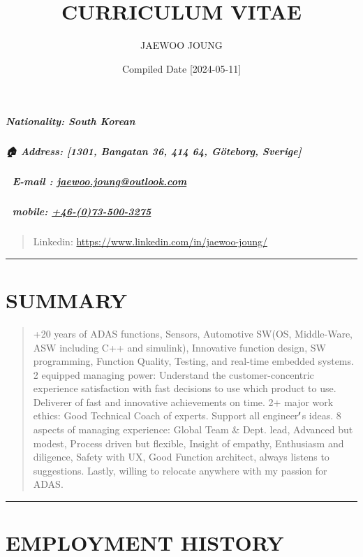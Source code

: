 \documentclass[12pt,a4paper]{article}
\title{ CURRICULUM VITAE }
\author{ JAEWOO JOUNG }
\date{ Compiled Date [2024-05-11] }
\begin{document}
\maketitle

\subparagraph{Nationality: South Korean}
\subparagraph{🏠 Address: [1301, Bangatan 36, 414 64, Göteborg, Sverige]}
\subparagraph{📨 E-mail : \href{mailto:jaewoo.joung@outlook.com}{jaewoo.joung@outlook.com}}
\subparagraph{📲 mobile:  \href{+46-(0)73-500-3275}{+46-(0)73-500-3275}}
\begin{quote}
Linkedin: \href{https://www.linkedin.com/in/jaewoo-joung/}{https://www.linkedin.com/in/jaewoo-joung/}

\end{quote}
\rule{\textwidth}{1pt}
\section{SUMMARY}
\begin{quote}
+20 years of ADAS functions, Sensors, Automotive SW(OS, Middle-Ware, ASW including C++ and simulink), Innovative function design, SW programming, Function Quality, Testing, and real-time embedded systems. 2 equipped managing power: Understand the customer-concentric experience satisfaction with fast decisions to use which product to use. Deliverer of fast and innovative achievements on time. 2+ major work ethics: Good Technical Coach of experts. Support all engineer\ensuremath{\rq}s ideas. 8 aspects of managing experience: Global Team \& Dept. lead, Advanced but modest, Process driven but flexible, Insight of empathy, Enthusiasm and diligence, Safety with UX, Good Function architect, always listens to suggestions. Lastly, willing to relocate anywhere with my passion for ADAS.

\end{quote}
\rule{\textwidth}{1pt}
\section{EMPLOYMENT HISTORY}
\end{document}
